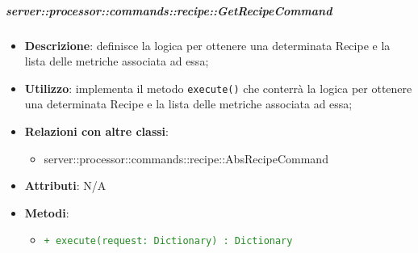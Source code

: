         \subparagraph{server::processor::commands::recipe::GetRecipeCommand} %
        \label{subp:bdsm_app_server_processor_commands_recipe_getrecipecommand}
        \begin{itemize}
          \item \textbf{Descrizione}: definisce la logica per ottenere una determinata Recipe e la lista delle metriche associata ad essa;
          \item \textbf{Utilizzo}: implementa il metodo \texttt{execute()} che conterrà la logica per ottenere una determinata Recipe e la lista delle metriche associata ad essa;
          \item \textbf{Relazioni con altre classi}:
            \begin{itemize}
              \item server::processor::commands::recipe::AbsRecipeCommand
            \end{itemize}
          \item \textbf{Attributi}: N/A
          \item \textbf{Metodi}:
          \begin{itemize}
              \item \textcolor{forestgreen}{\texttt{+ execute(request: Dictionary) : Dictionary}}
          \end{itemize}
        \end{itemize}

